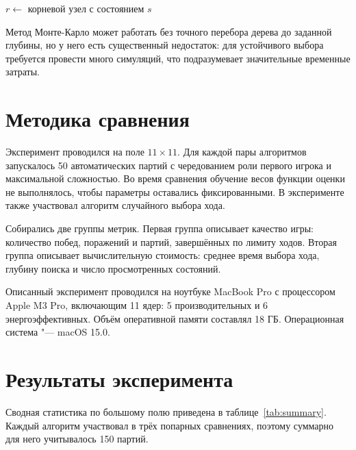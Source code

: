 \documentclass{csmathnotes}
\begin{document}
\begin{algorithm}[!tbp]
\caption{Метод Монте-Карло}\label{alg:montecarlo}
$r \leftarrow$ корневой узел с состоянием $s$\;
\end{algorithm}

Метод Монте-Карло может работать без точного перебора дерева до заданной глубины, но у него есть существенный недостаток: для устойчивого выбора требуется провести много симуляций, что подразумевает значительные временные затраты.

\section*{Методика сравнения}

Эксперимент проводился на поле $11 \times 11$. Для каждой пары алгоритмов запускалось 50 автоматических партий с чередованием роли первого игрока и максимальной сложностью. Во время сравнения обучение весов функции оценки не выполнялось, чтобы параметры оставались фиксированными. В эксперименте также участвовал алгоритм случайного выбора хода.

Собирались две группы метрик. Первая группа описывает качество игры: количество побед, поражений и партий, завершённых по лимиту ходов. Вторая группа описывает вычислительную стоимость: среднее время выбора хода, глубину поиска и число просмотренных состояний.

Описанный эксперимент проводился на ноутбуке MacBook Pro с процессором Apple M3 Pro, включающим 11 ядер: 5 производительных и 6 энергоэффективных. Объём оперативной памяти составлял 18 ГБ. Операционная система "--- macOS 15.0.

\section*{Результаты эксперимента}

Сводная статистика по большому полю приведена в таблице~\ref{tab:summary}. Каждый алгоритм участвовал в трёх попарных сравнениях, поэтому суммарно для него учитывалось 150 партий.
\end{document}
